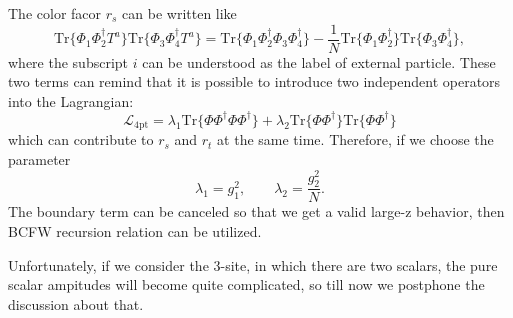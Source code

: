 \documentclass[12pt]{article}
\numberwithin{equation}{section}
\begin{document}
The color facor $r_s$ can be written like
\begin{equation}
    \mathrm{Tr}\{\Phi_1\Phi_2^\dagger T^a\}\mathrm{Tr}\{\Phi_3\Phi_4^\dagger T^a\}=\mathrm{Tr}\{\Phi_1\Phi_2^\dagger\Phi_3\Phi_4^\dagger\}-\frac{1}{N}\mathrm{Tr}\{\Phi_1\Phi_2^\dagger\}\mathrm{Tr}\{\Phi_3\Phi_4^\dagger\},
\end{equation}
where the subscript $i$ can be understood as the label of external particle. These two terms can remind that it is possible to introduce two independent operators into the Lagrangian:
\begin{equation}
    \mathcal{L}_{\text{4pt}}=\lambda_1\mathrm{Tr}\{\Phi\Phi^\dagger\Phi\Phi^\dagger\}+\lambda_2\mathrm{Tr}\{\Phi\Phi^\dagger\}\mathrm{Tr}\{\Phi\Phi^\dagger\}
\end{equation}
which can contribute to $r_s$ and $r_t$ at the same time. Therefore, if we choose the parameter
\begin{equation}
    \lambda_1=g_1^2,\qquad \lambda_2=\frac{g_2^2}{N}.
\end{equation}
The boundary term can be canceled so that we get a valid large-z behavior, then BCFW recursion relation can be utilized.

Unfortunately, if we consider the 3-site, in which there are two scalars, the pure scalar ampitudes will become quite complicated, so till now we postphone the discussion about that. 
\end{document}

